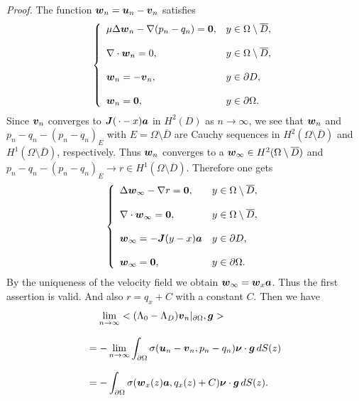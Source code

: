 \endproclaim

{\it\noindent Proof.}
The function $\mbox{\boldmath $w$}_n=\mbox{\boldmath $u$}_n-\mbox{\boldmath $v$}_n$ satisfies
$$\left\{
\begin{array}{ll}
\displaystyle
\mu\Delta\mbox{\boldmath $w$}_n-\nabla (p_n-q_n)=\mbox{\boldmath $0$}, & y\in\Omega\setminus\overline{D},
\\
\\
\displaystyle
\nabla\cdot\mbox{\boldmath $w$}_n=0, & y\in\Omega\setminus\overline{D},\\
\\
\displaystyle
\mbox{\boldmath $w$}_n=-\mbox{\boldmath $v$}_n, & y\in\partial D,
\\
\\
\displaystyle
\mbox{\boldmath $w$}_n=\mbox{\boldmath $0$}, & y\in\partial\Omega.
\end{array}
\right.
$$
Since $\mbox{\boldmath $v$}_n$ converges to $\mbox{\boldmath $J$}(\,\cdot-x)\mbox{\boldmath $a$}$ in $H^2(D)$
as $n\rightarrow\infty$,
we see that $\mbox{\boldmath $w$}_n$ and $p_n-q_n-(p_n-q_n)_{E}$ with $E=\Omega\setminus\overline{D}$ are
Cauchy sequences in $H^2(\Omega\setminus\overline{D})$ and $H^1(\Omega\setminus\overline{D})$, respectively.
Thus $\mbox{\boldmath $w$}_n$ converges to a $\mbox{\boldmath$w$}_{\infty}\in H^2(\Omega\setminus\overline{D})$ and $p_n-q_n-(p_n-q_n)_{E}\rightarrow r\in H^1(\Omega\setminus\overline{D})$.  Therefore one gets
$$\left\{
\begin{array}{ll}
\displaystyle
\Delta\mbox{\boldmath $w$}_{\infty}-\nabla r=\mbox{\boldmath $0$}, & y\in\Omega\setminus\overline{D},
\\
\\
\displaystyle
\nabla\cdot\mbox{\boldmath $w$}_{\infty}=\mbox{\boldmath $0$}, & y\in\Omega\setminus\overline{D},\\
\\
\displaystyle
\mbox{\boldmath $w$}_{\infty}=-\mbox{\boldmath $J$}(y-x)\mbox{\boldmath $a$} & y\in\partial D,
\\
\\
\displaystyle
\mbox{\boldmath $w$}_{\infty}=\mbox{\boldmath $0$}, & y\in\partial\Omega.
\end{array}
\right.
$$
By the uniqueness of the velocity field we obtain $\mbox{\boldmath $w$}_{\infty}=\mbox{\boldmath $w$}_x\mbox{\boldmath $a$}$.
Thus the first assertion is valid.
And also $r=q_x+C$ with a constant $C$.
Then we have
$$\begin{array}{l}
\displaystyle
\,\,\,\,\,\,
\lim_{n\rightarrow\infty}<(\Lambda_0-\Lambda_D)\mbox{\boldmath $v$}_n\vert_{\partial\Omega},
\mbox{\boldmath $g$}>
\\
\\
\displaystyle
=
-\lim_{n\rightarrow\infty}\int_{\partial\Omega}\sigma(\mbox{\boldmath $u$}_n-\mbox{\boldmath $v$}_n, p_n-q_n)\mbox{\boldmath $\nu$}\cdot\mbox{\boldmath $g$}\,dS(z)
\\
\\
\displaystyle
=-\int_{\partial\Omega}\sigma(\mbox{\boldmath $w$}_x(z)\mbox{\boldmath $a$}, q_x(z)+C)
\mbox{\boldmath $\nu$}\cdot\mbox{\boldmath $g$}\,dS(z).
\end{array}
$$
